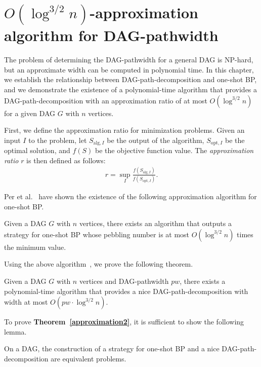 \documentclass[runningheads]{llncs}
\theoremstyle{plain}
\theoremstyle{definition}
\begin{document}
\section{$O(\log^{3/2} n)$-approximation algorithm for DAG-pathwidth}

The problem of determining the DAG-pathwidth for a general DAG is NP-hard, but an approximate width can be computed in polynomial time. In this chapter, we establish the relationship between DAG-path-decomposition and one-shot BP, and we demonstrate the existence of a polynomial-time algorithm that provides a DAG-path-decomposition with an approximation ratio of at most $O(\log ^{3/2} n)$ for a given DAG $G$ with $n$ vertices.

First, we define the approximation ratio for minimization problems. Given an input $I$ to the problem, let $S_{\mathrm{alg}, I}$ be the output of the algorithm, $S_{\mathrm{opt}, I}$ be the optimal solution, and $f(S)$ be the objective function value. The \emph{approximation ratio} $r$ is then defined as follows:
\begin{align*}
    r = \sup_{I}\frac{f(S_{\mathrm{alg}, I})}{f(S_{\mathrm{opt}, I})}.
\end{align*}

Per et al.~\cite{art20} have shown the existence of the following approximation algorithm for one-shot BP.

\begin{proposition}
    Given a DAG $G$ with $n$ vertices, there exists an algorithm that outputs a strategy for one-shot BP whose pebbling number is at most $O(\log ^{3/2} n)$ times the minimum value.
\end{proposition}

Using the above algorithm~\cite{art20}, we prove the following theorem.

\begin{theorem}\label{approximation2}
    Given a DAG $G$ with $n$ vertices and DAG-pathwidth $pw$, there exists a polynomial-time algorithm that provides a nice DAG-path-decomposition with width at most $O(pw \cdot \log ^{3/2} n)$.
\end{theorem}

To prove \textbf{Theorem~\ref{approximation2}}, it is sufficient to show the following lemma.

\begin{lemma}\label{lemma_approximation2}
    On a DAG, the construction of a strategy for one-shot BP and a nice DAG-path-decomposition are equivalent problems.
\end{lemma}
\end{document}
